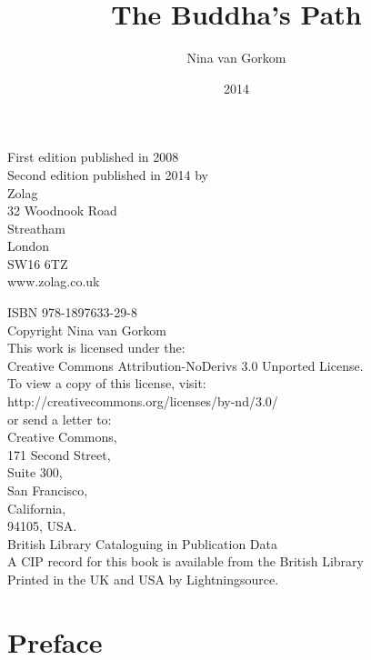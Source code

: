 \documentclass{book}
\title{The Buddha's Path}
\author{Nina van Gorkom}
\date{2014}
\begin{document}
\maketitle
\vspace*{10pt}
\noindent First edition published in 2008 \\
Second edition published in 2014 by\\
Zolag\\
32 Woodnook Road\\
Streatham\\
London\\
SW16 6TZ\\
www.zolag.co.uk\\
\vspace{10pt}

\noindent ISBN 978-1897633-29-8\\ 
Copyright Nina van Gorkom\\

\noindent This work is licensed under the: \\
Creative Commons Attribution-NoDerivs 3.0 Unported License.\\
To view a copy of this license, visit:\\
http://creativecommons.org/licenses/by-nd/3.0/ \\
or send a letter to: \\
Creative Commons, \\
171 Second Street, \\
Suite 300, \\
San Francisco, \\
California, \\
94105, USA.\\


\noindent British Library Cataloguing in Publication Data\\
A CIP record for this book is available from the British Library\\
Printed in the UK and USA by
Lightningsource.
\frontmatter
\tableofcontents

\chapter{Preface}
\end{document}
